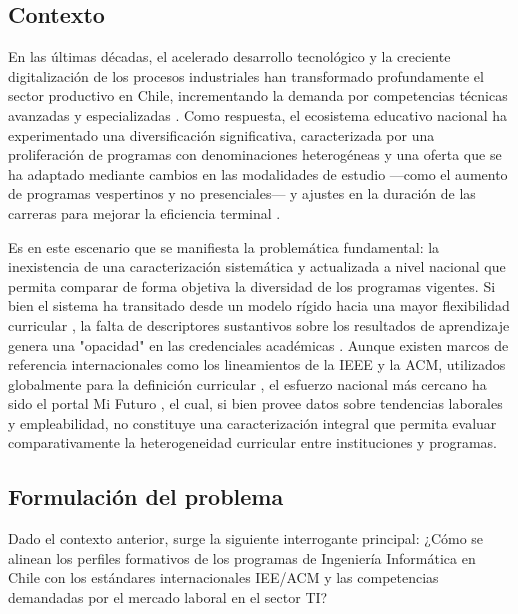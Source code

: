 \documentclass[journal,twoside,web]{ieeecolor}
\begin{document}
\subsection{Contexto} \label{Contexto}
En las últimas décadas, el acelerado desarrollo tecnológico y la creciente digitalización de los procesos industriales han transformado profundamente el sector productivo en Chile, incrementando la demanda por competencias técnicas avanzadas y especializadas \cite{ITTalent2021}. Como respuesta, el ecosistema educativo nacional ha experimentado una diversificación significativa, caracterizada por una proliferación de programas con denominaciones heterogéneas y una oferta que se ha adaptado mediante cambios en las modalidades de estudio —como el aumento de programas vespertinos y no presenciales— y ajustes en la duración de las carreras para mejorar la eficiencia terminal \cite{LANDONI2015}.

Es en este escenario que se manifiesta la problemática fundamental: la inexistencia de una caracterización sistemática y actualizada a nivel nacional que permita comparar de forma objetiva la diversidad de los programas vigentes. Si bien el sistema ha transitado desde un modelo rígido hacia una mayor flexibilidad curricular \cite{LANDONI2015}, la falta de descriptores sustantivos sobre los resultados de aprendizaje genera una "opacidad" en las credenciales académicas \cite{LANDONI2015}. Aunque existen marcos de referencia internacionales como los lineamientos de la IEEE y la ACM, utilizados globalmente para la definición curricular \cite{CC2020TaskForce2021}, el esfuerzo nacional más cercano ha sido el portal Mi Futuro \cite{mifuturo_buscador}, el cual, si bien provee datos sobre tendencias laborales y empleabilidad, no constituye una caracterización integral que permita evaluar comparativamente la heterogeneidad curricular entre instituciones y programas.
\subsection{Formulación del problema} \label{formulación}

Dado el contexto anterior, surge la siguiente interrogante principal: ¿Cómo se alinean los perfiles formativos de los programas de Ingeniería Informática en Chile con los estándares internacionales IEE/ACM y las competencias demandadas por el mercado laboral en el sector TI?  
\end{document}
